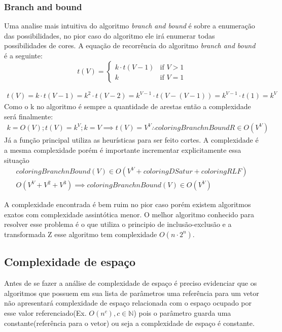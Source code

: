 \documentclass[12pt]{article}
\begin{document}
\subsubsection{Branch and bound}
\label{sec:orgd5d7050}
Uma analise mais intuitiva do algoritmo \emph{branch and bound} é sobre a enumeração das possibilidades, no pior caso do algoritmo ele irá enumerar todas possibilidades de cores. A equação de recorrência do algoritmo \emph{branch and bound} é a seguinte:
\begin{equation}
t(V) = 
\begin{cases}
k\cdot t(V-1) & \text{if $V>1$}\\
k & \text{if $V = 1$}
\end{cases}
\end{equation}

\begin{equation}
\begin{aligned}
t(V)=k\cdot t(V-1)=k^2\cdot t(V-2) = k^{V-1}\cdot t(V-(V-1)) = k^{V-1}\cdot t(1)=k^V
\end{aligned}
\end{equation}
Como o k no algoritmo é sempre a quantidade de arestas então a complexidade será finalmente:
\begin{equation}
\begin{aligned}
k = O(V);
t(V)=k^V; k=V \implies t(V)=V^V
\therefore coloringBranchnBoundR \in O(V^V)
\end{aligned}
\end{equation}
Já a função principal utiliza as heurísticas para ser feito cortes. A complexidade é a mesma complexidade porém é importante incrementar explicitamente essa situação
\begin{equation}
\begin{aligned}
coloringBranchnBound(V) \in O(V^V + coloringDSatur + coloringRLF)\\
O(V^V + V^2 + V^3)\implies coloringBranchnBound(V) \in O(V^V)
\end{aligned}
\end{equation}

A complexidade encontrada é bem ruim no pior caso porém existem algoritmos exatos com complexidade assintótica menor. O melhor algoritmo conhecido para resolver esse problema é o que utiliza o principio de inclusão-exclusão e a transformada Z \cite{bjoerklund09_set_partit_via_inclus_exclus} esse algoritmo tem complexidade \(O(n\cdot 2^n)\).

\subsection{Complexidade de espaço}
\label{sec:org220fcaa}
Antes de se fazer a análise de complexidade de espaço é preciso evidenciar que os algoritmos que possuem em sua lista de parâmetros uma referência para um vetor não apresentará complexidade de espaço relacionada com o espaço ocupado por esse valor referenciado(Ex. \(O(n^c), c \in \mathbb{N}\)) pois o parâmetro guarda uma constante(referência para o vetor) ou seja a complexidade de espaço é constante.\cite{spacecomplexitypointer}
\end{document}
